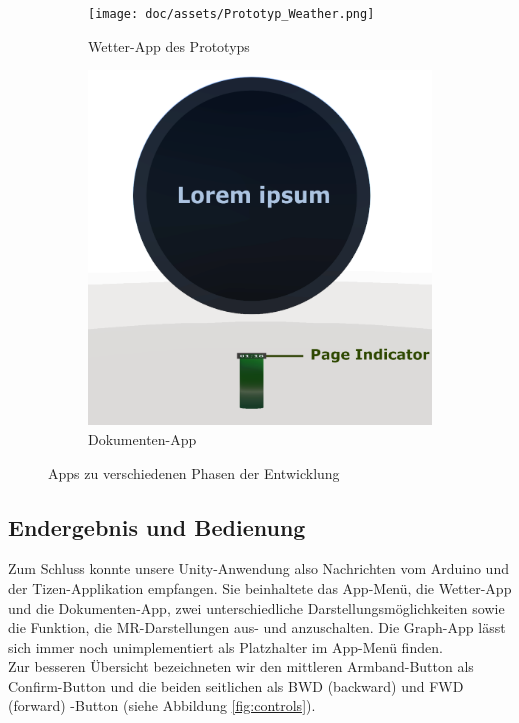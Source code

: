 \documentclass[11pt, a4paper]{article}
\begin{document}
\begin{figure}[h]
	\begin{subfigure}[c]{0.4\textwidth}
        \centering
	   \texttt{[image: doc/assets/Prototyp\_Weather.png]}
	   \caption{Wetter-App des Prototyps}
	   \label{fig:first_weatherApp}
	\end{subfigure}
	\begin{subfigure}[c]{0.5\textwidth}
        \centering
	   \includegraphics[scale=.55]{doc/assets/PageIndicator.png}
	   \caption{Dokumenten-App}
	   \label{fig:documentsApp}
	\end{subfigure}
    \centering
	\caption{Apps zu  verschiedenen Phasen der Entwicklung}
\end{figure}

\subsection{Endergebnis und Bedienung}

Zum Schluss konnte unsere Unity-Anwendung also Nachrichten vom Arduino und der Tizen-Applikation empfangen. Sie beinhaltete das App-Menü, die Wetter-App und die Dokumenten-App, zwei unterschiedliche Darstellungsmöglichkeiten sowie die Funktion, die MR-Darstellungen aus- und anzuschalten. Die Graph-App lässt sich immer noch unimplementiert als Platzhalter im App-Menü finden.\\
Zur besseren Übersicht bezeichneten wir den mittleren Armband-Button als Confirm-Button und die beiden seitlichen als BWD (backward) und FWD (forward) -Button (siehe Abbildung \ref{fig:controls}).\\
\end{document}
